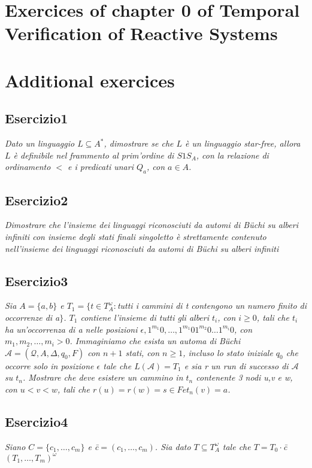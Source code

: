 \documentclass[12pt]{article}
\newcommand{\A}{\ensuremath{\mathcal{A}}\xspace}
\newcommand{\Buchi}{\ensuremath{\mathcal{A} = (\mathcal{Q},A,\Delta,q_0,F)}\xspace}
\begin{document}
\section{Exercices of chapter 0 of Temporal Verification of Reactive Systems}

\section{Additional exercices}
\subsection*{Esercizio1}
\textit{Dato un linguaggio $L \subseteq A^*$, dimostrare se che $L$ è un linguaggio star-free, allora $L$ è definibile nel frammento al prim'ordine di $S1S_A$, con la relazione di ordinamento $<$ e i predicati unari $Q_a$, con $a \in A$.}


\subsection*{Esercizio2}
\textit{Dimostrare che l'insieme dei linguaggi riconosciuti da automi di B\"uchi su alberi infiniti con insieme degli stati finali singoletto è strettamente contenuto nell'insieme dei linguaggi riconosciuti da automi di B\"uchi su alberi infiniti}


\subsection*{Esercizio3}
\textit{Sia $A=\{a,b\}$ e $T_1=\{t\in T^{\omega}_A:$tutti i cammini di t contengono un numero finito di occorrenze di a$\}$. $T_1$ contiene l'insieme di tutti gli alberi $t_i$, con $i\geqslant 0$, tali che $t_i$ ha un'occorrenza di a nelle posizioni $\epsilon, 1^{m_1}0,\ldots,1^{m_1}01^{m_2}0\ldots 1^{m_i}0$, con $m_1,m_2,\ldots,m_i>0$. Immaginiamo che esista un automa di B\"uchi $\Buchi$ con $n+1$ stati, con $n\geqslant 1$, incluso lo stato iniziale $q_0$ che occorre solo in posizione $\epsilon$ tale che $L(\A)=T_1$ e sia r un run di successo di $\A$ su $t_n$. Mostrare che deve esistere un cammino in $t_n$ contenente 3 nodi u,v e w, con $u<v<w$, tali che $r(u)=r(w)=s \in F e t_n(v)=a$.}


\subsection*{Esercizio4}
\textit{Siano $C=\{c_1,\ldots,c_m\}$ e \=c$= ( c_1,\ldots,c_m) $. Sia dato $T \subseteq T^{\omega}_A$ tale che $T=T_0 \cdot$\=c$(T_1,\ldots,T_m)^{\omega}$}
\end{document}
